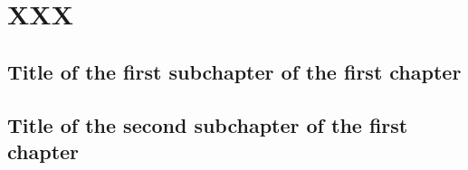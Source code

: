 \chapter{XXX}

\section{Title of the first subchapter of the first chapter}

\section{Title of the second subchapter of the first chapter}
